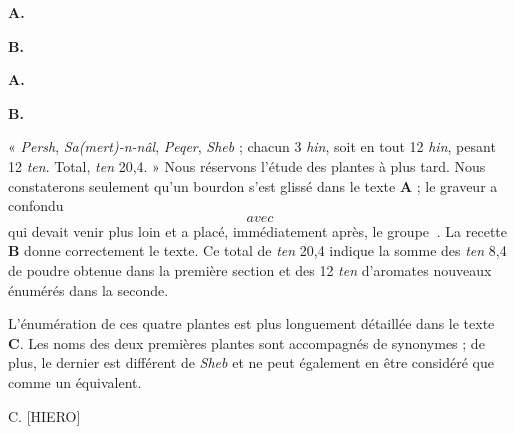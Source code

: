 \documentclass[a4paper, 11pt, oneside]{article}
\newcommand*\hieroAAAR{}
\newcommand*\hieroAABT{}
\newcommand*\hieroAAEH{\raisebox{0.5ex}{}}
\newcommand*\hieroAAFO{\raisebox{0.5ex}{}}
\newcommand*\hieroAAFT{}
\newcommand*\hieroAAGA{}
\newcommand*\hieroAAGD{}
\newcommand*\hieroAAGN{}
\newcommand*\hieroAAHX{}
\newcommand*\hieroAAIT{}
\newcommand*\hieroAAIU{}
\newcommand*\hieroAAJH{}
\newcommand*\hieroAAKW{}
\newcommand*\hieroAAKX{}
\newcommand*\hieroAAKY{}
\newcommand*\hieroAAKZ{}
\newcommand*\hieroAALA{}
\newcommand*\hieroAALB{}
\newcommand*\hieroAALC{}
\newcommand*\hieroAALD{}
\newcommand*\hieroAALE{}
\newcommand*\hieroAALF{}
\newcommand*\hieroAALG{}
\newcommand*\hieroAALH{}
\newcommand*\hieroAALI{}
\newcommand*\hieroAALJ{}
\newcommand*\hieroAAMQ{}
\begin{document}
\hspace*{10mm}\textbf{A.}\hspace*{5mm} $\hieroAAKW\:\hieroAAAR\:\hieroAAKX$ \hspace*{5mm} $\hieroAAKY\:\hieroAAKZ\:\hieroAAKX$ \hspace*{7.2mm} $\hieroAALA\:\hieroAAAR\:\hieroAAKX$ \hspace*{5mm} $\hieroAALB\:\hieroAAAR\:\hieroAAKX$

\hspace*{10mm}\textbf{B.}\hspace*{5mm} $\hieroAALC\:\hieroAAFO\:\hieroAALD$ \hspace*{6mm} $\hieroAALE\:\hieroAAEH\:\hieroAALF\:\hieroAAGD\:\hieroAABT\:\hieroAAKX$ \hspace*{1mm} $\hieroAALA\:\hieroAAGD\:\hieroAAKX$ \hspace*{5mm} $\hieroAAHX\:\hieroAAFO\:\hieroAAKX$

\hspace*{10mm}\textbf{A.}\hspace*{5mm} $\hieroAALG\:\hieroAAIU$ \hspace*{15mm} $\hieroAAIT\:\hieroAAIU\:\hieroAAGA\:\hieroAAJH$

\hspace*{10mm}\textbf{B.}\hspace*{5mm} $\hieroAALG\:\hieroAAIU\:\hieroAAGN\:\hieroAAFT\:\hieroAAIU\:\hieroAAGN\:\hieroAAFT\:\hieroAAMQ\:\hieroAAGA\:\hieroAALH$

« \emph{Persh}, \emph{Sa(mert)-n-nâl}, \emph{Peqer}, \emph{Sheb} ; chacun 3 \emph{hin}, soit en tout 12 \emph{hin}, pesant 12 \emph{ten}. Total, \emph{ten} 20,4. » Nous réservons l'étude des plantes à plus tard. Nous constaterons seulement qu'un bourdon s'est glissé dans le texte \textbf{A} ; le graveur a confondu $\hieroAALI$ avec $\hieroAALJ$ qui devait venir plus loin et a placé, immédiatement après, le groupe $\hieroAAGA\:\hieroAAJH$. La recette \textbf{B} donne correctement le texte. Ce total de \emph{ten} 20,4 indique la somme des \emph{ten} 8,4 de poudre obtenue dans la première section et des 12 \emph{ten} d'aromates nouveaux énumérés dans la seconde.

L'énumération de ces quatre plantes est plus longuement détaillée dans le texte \textbf{C}. Les noms des deux premières plantes sont accompagnés de synonymes ; de plus, le dernier est différent de \emph{Sheb} et ne peut également en être considéré que comme un équivalent.

C. [HIERO]
\end{document}
